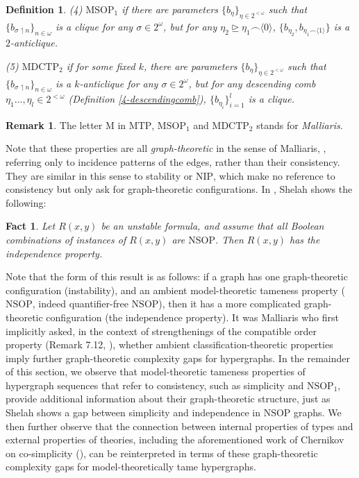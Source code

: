 \documentclass[12pt]{amsart}
\newtheorem{fact}[theorem]{Fact}
\newtheorem{definition}{Definition}[section]
\theoremstyle{definition}
\newtheorem{remark}[theorem]{Remark}
\begin{document}
\begin{definition}
    (4) $\mathrm{MSOP}_{1}$ if there are parameters $\{b_{\eta}\}_{\eta \in 2^{<\omega}}$ such that $\{ b_{\sigma \upharpoonleft n}\}_{n \in \omega}$ is a clique for any $\sigma \in 2^{\omega}$, but for any $\eta_{2} \unrhd \eta_{1} \smallfrown \langle 0\rangle$, $\{b_{\eta_{2}},  b_{\eta_{1} \smallfrown \langle 1\rangle}\}$ is a $2$-anticlique.

    (5) $\mathrm{MDCTP}_{2}$ if for some fixed $k$, there are parameters $\{b_{\eta}\}_{\eta \in 2^{<\omega}}$ such that $\{b_{\sigma \upharpoonleft n}\}_{n \in \omega}$ is a $k$-anticlique for any $\sigma \in 2^{\omega}$, but for any descending comb $\eta_{1} \ldots, \eta_{l} \in 2^{< \omega}$ (Definition \ref{4-descendingcomb}), $\{ b_{\eta_{i}}\}_{i=1}^{l}$ is a clique.
\end{definition}

\begin{remark}
    The letter $\mathrm{M}$ in $\mathrm{MTP}$, $\mathrm{MSOP}_{1}$ and $\mathrm{MDCTP}_{2}$ stands for \textit{Malliaris}. \end{remark}

Note that these properties are all \textit{graph-theoretic} in the sense of Malliaris, \cite{Mal10}, referring only to incidence patterns of the edges, rather than their consistency. They are similar in this sense to stability or $\mathrm{NIP}$, which make no reference to consistency but only ask for graph-theoretic configurations. In \cite{Sh90}, Shelah shows the following:

\begin{fact}
    Let $R(x, y)$ be an unstable formula, and assume that all Boolean combinations of instances of $R(x, y)$ are $\mathrm{NSOP}$. Then $R(x, y)$ has the independence property.
\end{fact}

Note that the form of this result is as follows: if a graph has one graph-theoretic configuration (instability), and an ambient model-theoretic tameness property ($\mathrm{NSOP}$, indeed quantifier-free $\mathrm{NSOP}$), then it has a more complicated graph-theoretic configuration (the independence property). It was Malliaris who first implicitly asked, in the context of strengthenings of the compatible order property (Remark 7.12, \cite{Mal12}), whether ambient classification-theoretic properties imply further graph-theoretic complexity gaps for hypergraphs. In the remainder of this section, we observe that model-theoretic tameness properties of hypergraph sequences that refer to consistency, such as simplicity and $\mathrm{NSOP}_{1}$, provide additional information about their graph-theoretic structure, just as Shelah shows a gap between simplicity and independence in $\mathrm{NSOP}$ graphs. We then further observe that the connection between internal properties of types and external properties of theories, including the aforementioned work of Chernikov on co-simplicity (\cite{Che14}), can be reinterpreted in terms of these graph-theoretic complexity gaps for model-theoretically tame hypergraphs.
\end{document}
